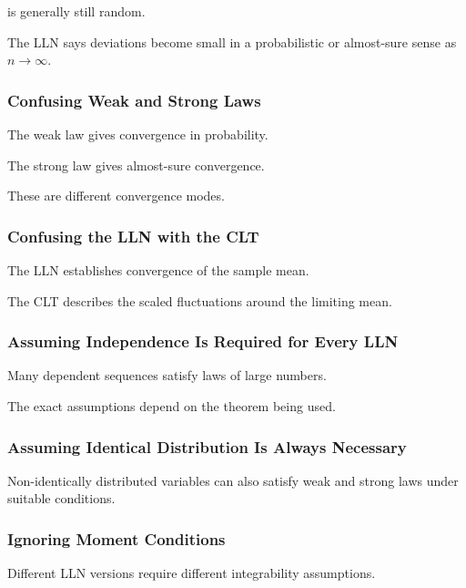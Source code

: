 is generally still random.

The LLN says deviations become small in a probabilistic or almost-sure
sense as \(n\to\infty\).

\subsubsection{Confusing Weak and Strong Laws}

The weak law gives convergence in probability.

The strong law gives almost-sure convergence.

These are different convergence modes.

\subsubsection{Confusing the LLN with the CLT}

The LLN establishes convergence of the sample mean.

The CLT describes the scaled fluctuations around the limiting mean.

\subsubsection{Assuming Independence Is Required for Every LLN}

Many dependent sequences satisfy laws of large numbers.

The exact assumptions depend on the theorem being used.

\subsubsection{Assuming Identical Distribution Is Always Necessary}

Non-identically distributed variables can also satisfy weak and strong
laws under suitable conditions.

\subsubsection{Ignoring Moment Conditions}

Different LLN versions require different integrability assumptions.


